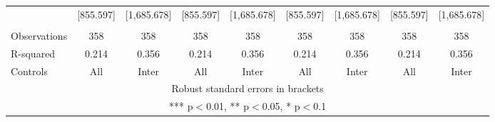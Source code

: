 \begin{tabular}{lcccccccc}
 & [855.597] & [1,685.678] & [855.597] & [1,685.678] & [855.597] & [1,685.678] & [855.597] & [1,685.678] \\
 &  &  &  &  &  &  &  &  \\
Observations & 358 & 358 & 358 & 358 & 358 & 358 & 358 & 358 \\
R-squared & 0.214 & 0.356 & 0.214 & 0.356 & 0.214 & 0.356 & 0.214 & 0.356 \\
 Controls & All & Inter & All & Inter & All & Inter & All & Inter \\ \hline
\multicolumn{9}{c}{ Robust standard errors in brackets} \\
\multicolumn{9}{c}{ *** p$<$0.01, ** p$<$0.05, * p$<$0.1} \\
\end{tabular}
